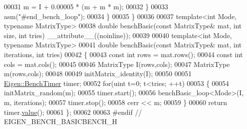 \begin{DoxyCode}
00031       m = I + 0.00005 * (m + m * m);
00032     \}
00033     \textcolor{keyword}{asm}(\textcolor{stringliteral}{"#end\_bench\_loop"});
00034   \}
00035 \}
00036 
00037 \textcolor{keyword}{template}<\textcolor{keywordtype}{int} Mode, \textcolor{keyword}{typename} MatrixType>
00038 \textcolor{keywordtype}{double} benchBasic(\textcolor{keyword}{const} MatrixType& mat, \textcolor{keywordtype}{int} size, \textcolor{keywordtype}{int} tries) \_\_attribute\_\_((noinline));
00039 
00040 \textcolor{keyword}{template}<\textcolor{keywordtype}{int} Mode, \textcolor{keyword}{typename} MatrixType>
00041 \textcolor{keywordtype}{double} benchBasic(\textcolor{keyword}{const} MatrixType& mat, \textcolor{keywordtype}{int} iterations, \textcolor{keywordtype}{int} tries)
00042 \{
00043   \textcolor{keyword}{const} \textcolor{keywordtype}{int} rows = mat.rows();
00044   \textcolor{keyword}{const} \textcolor{keywordtype}{int} cols = mat.cols();
00045 
00046   MatrixType I(rows,cols);
00047   MatrixType m(rows,cols);
00048 
00049   initMatrix\_identity(I);
00050 
00051   \hyperlink{class_eigen_1_1_bench_timer}{Eigen::BenchTimer} timer;
00052   \textcolor{keywordflow}{for}(uint t=0; t<tries; ++t)
00053   \{
00054     initMatrix\_random(m);
00055     timer.start();
00056     benchBasic\_loop<Mode>(I, m, iterations);
00057     timer.stop();
00058     cerr << m;
00059   \}
00060   \textcolor{keywordflow}{return} timer.\hyperlink{class_eigen_1_1_bench_timer_a26760f963ed8b64c126159bfea57735e}{value}();
00061 \};
00062 
00063 \textcolor{preprocessor}{#endif // EIGEN\_BENCH\_BASICBENCH\_H}
\end{DoxyCode}
